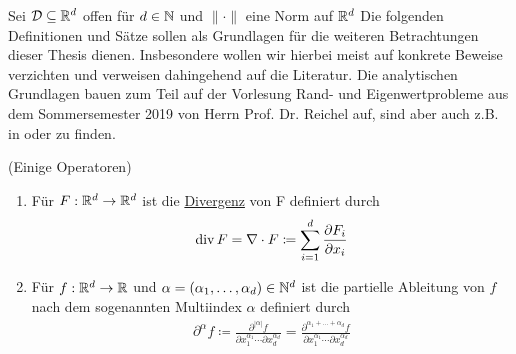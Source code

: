 Sei $\mathcal{D} \subseteq \mathbb{R}^d$ offen für $d\in \mathbb{N}$ und $\lVert \cdot \rVert$ eine Norm auf $\mathbb{R}^d$
Die folgenden Definitionen und Sätze sollen als Grundlagen für die weiteren Betrachtungen dieser Thesis dienen. Insbesondere wollen wir hierbei meist auf konkrete Beweise verzichten und verweisen dahingehend auf die Literatur. 
Die analytischen Grundlagen bauen zum Teil auf der Vorlesung Rand- und Eigenwertprobleme aus dem Sommersemester 2019 von Herrn Prof. Dr. Reichel auf, sind aber auch  z.B. in \cite{dobrowolski2010angewandte} oder \cite{evans10} zu finden.
\begin{Definition}(Einige Operatoren)
	\begin{enumerate}[label=(\alph*)]
		\item Für $F: \mathbb{R}^d \to \mathbb{R}^d$ ist die \underline{Divergenz} von F definiert durch
			\begin{align*}
				\operatorname{div} F = \nabla \cdot F \coloneqq \sum_{i=1}^{d} \frac{\partial F_i}{ \partial x_i}
			\end{align*}
		\item Für $f: \mathbb{R}^d \to \mathbb{R}$ und $\alpha = (\alpha_1,\dots,\alpha_d) \in \mathbb{N}^d$ ist die partielle Ableitung von $f$ nach dem sogenannten Multiindex $\alpha$ definiert durch
			\begin{align*}
				\partial^{\alpha}f \coloneqq 
				\frac{\partial^{|\alpha|} f}{\partial x_1 ^{\alpha_1} \cdots  \partial x_d^{\alpha_d} } 
				=\frac{\partial^{\alpha_1+\dots +\alpha_d} f}{\partial x_1 ^{\alpha_1} \cdots  \partial x_d^{\alpha_d} } 
			\end{align*}
	\end{enumerate}
\end{Definition}



